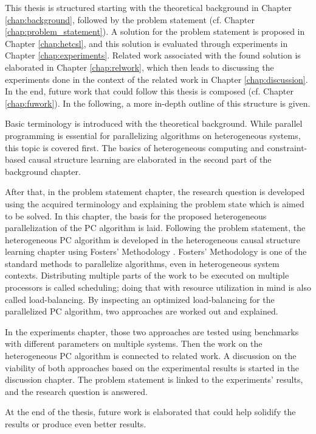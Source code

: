 This thesis is structured starting with the theoretical background in Chapter \ref{chap:background}, followed by the problem statement (cf. Chapter \ref{chap:problem_statement}). A solution for the problem statement is proposed in Chapter \ref{chap:hetcsl}, and this solution is evaluated through experiments in Chapter \ref{chap:experiments}. Related work associated with the found solution is elaborated in Chapter \ref{chap:relwork}, which then leads to discussing the experiments done in the context of the related work in Chapter \ref{chap:discussion}. In the end, future work that could follow this thesis is composed (cf. Chapter \ref{chap:fuwork}). In the following, a more in-depth outline of this structure is given.

Basic terminology is introduced with the theoretical background. While parallel programming is essential for parallelizing algorithms on heterogeneous systems, this topic is covered first. The basics of heterogeneous computing and constraint-based causal structure learning are elaborated in the second part of the background chapter.

After that, in the problem statement chapter, the research question is developed using the acquired terminology and explaining the problem state which is aimed to be solved. In this chapter, the basis for the proposed heterogeneous parallelization of the PC algorithm is laid. Following the problem statement, the heterogeneous PC algorithm is developed in the heterogeneous causal structure learning chapter using Fosters' Methodology \cite{fosterDesigningBuildingParallel1995}. Fosters' Methodology is one of the standard methods to parallelize algorithms, even in heterogeneous system contexts. Distributing multiple parts of the work to be executed on multiple processors is called scheduling; doing that with resource utilization in mind is also called load-balancing. By inspecting an optimized load-balancing for the parallelized PC algorithm, two approaches are worked out and explained.

In the experiments chapter, those two approaches are tested using benchmarks with different parameters on multiple systems. Then the work on the heterogeneous PC algorithm is connected to related work. A discussion on the viability of both approaches based on the experimental results is started in the discussion chapter. The problem statement is linked to the experiments' results, and the research question is answered.

At the end of the thesis, future work is elaborated that could help solidify the results or produce even better results.

